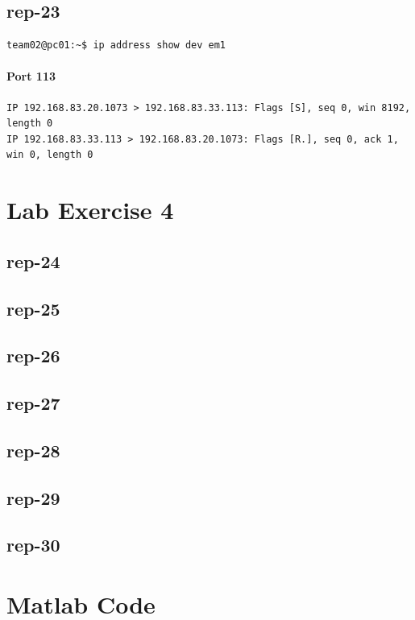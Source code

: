 \documentclass{article}
\begin{document}
\subsection{rep-23}

\begin{lstlisting}[label=listing:ip-command,caption={Command used to obtain IP address}]
team02@pc01:~$ ip address show dev em1
\end{lstlisting}

\paragraph{Port 113}
\begin{Verbatim}
IP 192.168.83.20.1073 > 192.168.83.33.113: Flags [S], seq 0, win 8192, length 0
IP 192.168.83.33.113 > 192.168.83.20.1073: Flags [R.], seq 0, ack 1, win 0, length 0
\end{Verbatim}

\section{Lab Exercise 4}

\subsection{rep-24}
\subsection{rep-25}
\subsection{rep-26}
\subsection{rep-27}
\subsection{rep-28}
\subsection{rep-29}
\subsection{rep-30}

\FloatBarrier

\appendix
\newpage
\section{Matlab Code}

\end{document}
